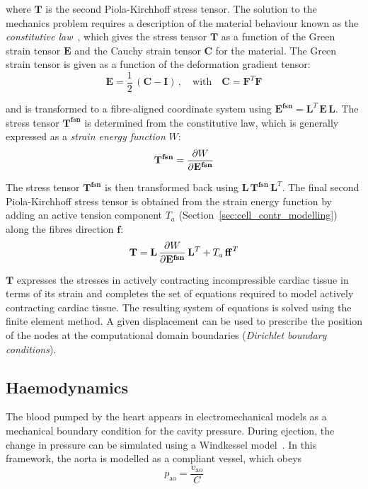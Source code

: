 \noindent
where $\mathbf{T}$ is the second Piola-Kirchhoff stress tensor. The solution to the mechanics problem requires a description of the material behaviour known as the \textit{constitutive law}~\cite{BonetWood:2008}, which gives the stress tensor $\mathbf{T}$ as a function of the Green strain tensor $\mathbf{E}$ and the Cauchy strain tensor $\mathbf{C}$ for the material. The Green strain tensor is given as a function of the deformation gradient tensor:
%
\begin{equation}
    \mathbf{E} = \frac{1}{2}\,(\mathbf{C}-\mathbf{I})\,,\quad\text{with}\quad \mathbf{C}=\mathbf{F}^T\mathbf{F}
\end{equation}

\noindent
and is transformed to a fibre-aligned coordinate system using $\mathbf{E^{fsn}}=\mathbf{L}^T\,\mathbf{E}\,\mathbf{L}$. The stress tensor $\mathbf{T^{fsn}}$ is determined from the constitutive law, which is generally expressed as a \textit{strain energy function} $W$:
%
\begin{equation}
    \mathbf{T^{fsn}} = \dfrac{\partial {W}}{\partial {\mathbf{E^{fsn}}}}
\end{equation}

\noindent
The stress tensor $\mathbf{T^{fsn}}$ is then transformed back using $\mathbf{L}\,\mathbf{T^{fsn}}\,\mathbf{L}^T$. The final second Piola-Kirchhoff stress tensor is obtained from the strain energy function by adding an active tension component $T_a$ (Section~\ref{sec:cell_contr_modelling}) along the fibres direction $\mathbf{f}$:
%
\begin{equation}\label{eq:eqce}
    \mathbf{T} = \mathbf{L}\,\dfrac{\partial {W}}{\partial {\mathbf{E^{fsn}}}}\,\mathbf{L}^T + T_a\,\mathbf{ff}^T
\end{equation}

\noindent
$\mathbf{T}$ expresses the stresses in actively contracting incompressible cardiac tissue in terms of its strain and completes the set of equations required to model actively contracting cardiac tissue. The resulting system of equations is solved using the finite element method. A given displacement can be used to prescribe the position of the nodes at the computational domain boundaries (\textit{Dirichlet boundary conditions}).


%
%
%
\subsection{Haemodynamics}\label{sec:hemodynamics_math_modelling}
The blood pumped by the heart appears in electromechanical models as a mechanical boundary condition for the cavity pressure. During ejection, the change in pressure can be simulated using a Windkessel model~\cite{Westerhof:1971}. In this framework, the aorta is modelled as a compliant vessel, which obeys
%
\begin{equation}\label{eq:firstwkelem}
    p_{\textrm{ao}} = \frac{v_{\textrm{ao}}}{C}
\end{equation}

